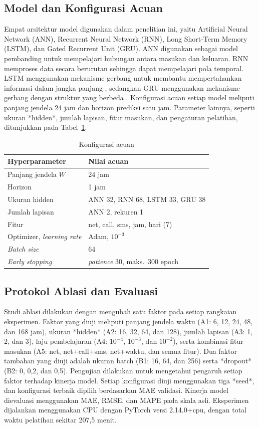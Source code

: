 \documentclass[conference,a4paper]{IEEEtran}
\begin{document}
\subsection{Model dan Konfigurasi Acuan}
Empat arsitektur model digunakan dalam penelitian ini, yaitu Artificial Neural Network (ANN), Recurrent Neural Network (RNN), Long Short-Term Memory (LSTM), dan Gated Recurrent Unit (GRU). ANN digunakan sebagai model pembanding untuk mempelajari hubungan antara masukan dan keluaran. RNN memproses data secara berurutan sehingga dapat mempelajari pola temporal. LSTM menggunakan mekanisme gerbang untuk membantu mempertahankan informasi dalam jangka panjang \cite{hochreiter1997lstm}, sedangkan GRU menggunakan mekanisme gerbang dengan struktur yang berbeda \cite{cho2014gru}. Konfigurasi acuan setiap model meliputi panjang jendela 24 jam dan horizon prediksi satu jam. Parameter lainnya, seperti ukuran *hidden*, jumlah lapisan, fitur masukan, dan pengaturan pelatihan, ditunjukkan pada Tabel~\ref{tab:acuan}.

\begin{table}[t]
  \centering
  \caption{Konfigurasi acuan}
  \label{tab:acuan}
  \begin{tabular}{@{}ll@{}}
    \toprule
    Hyperparameter & Nilai acuan \\
    \midrule
    Panjang jendela $W$ & 24 jam \\
    Horizon & 1 jam \\
    Ukuran hidden & ANN 32, RNN 68, LSTM 33, GRU 38 \\
    Jumlah lapisan & ANN 2, rekuren 1 \\
    Fitur & net, call, sms, jam, hari (7) \\
    Optimizer, \textit{learning rate} & Adam, $10^{-3}$ \\
    \textit{Batch size} & 64 \\
    \textit{Early stopping} & \textit{patience} 30, maks.\ 300 epoch \\
    \bottomrule
  \end{tabular}
\end{table}

\subsection{Protokol Ablasi dan Evaluasi}
Studi ablasi dilakukan dengan mengubah satu faktor pada setiap rangkaian eksperimen. Faktor yang diuji meliputi panjang jendela waktu (A1: 6, 12, 24, 48, dan 168 jam), ukuran *hidden* (A2: 16, 32, 64, dan 128), jumlah lapisan (A3: 1, 2, dan 3), laju pembelajaran (A4: \(10^{-4}\), \(10^{-3}\), dan \(10^{-2}\)), serta kombinasi fitur masukan (A5: net, net+call+sms, net+waktu, dan semua fitur). Dua faktor tambahan yang diuji adalah ukuran batch (B1: 16, 64, dan 256) serta *dropout* (B2: 0, 0,2, dan 0,5). Pengujian dilakukan untuk mengetahui pengaruh setiap faktor terhadap kinerja model. Setiap konfigurasi diuji menggunakan tiga *seed*, dan konfigurasi terbaik dipilih berdasarkan MAE validasi. Kinerja model dievaluasi menggunakan MAE, RMSE, dan MAPE pada skala asli. Eksperimen dijalankan menggunakan CPU dengan PyTorch versi 2.14.0+cpu, dengan total waktu pelatihan sekitar 207,5 menit.
\end{document}

